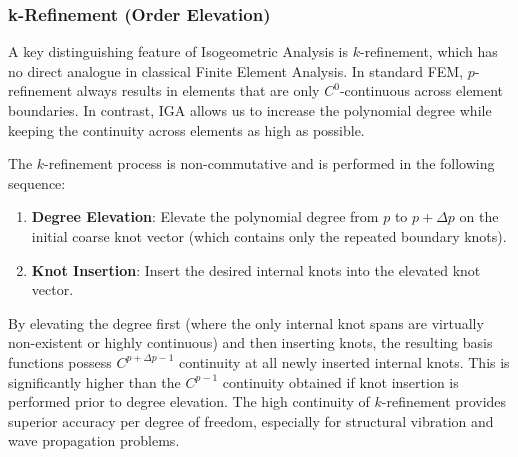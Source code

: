 \subsubsection{k-Refinement (Order Elevation)}
A key distinguishing feature of Isogeometric Analysis is $k$-refinement, which has no direct analogue in classical Finite Element Analysis. In standard FEM, $p$-refinement always results in elements that are only $C^0$-continuous across element boundaries. In contrast, IGA allows us to increase the polynomial degree while keeping the continuity across elements as high as possible.

The $k$-refinement process is non-commutative and is performed in the following sequence:
\begin{enumerate}
    \item \textbf{Degree Elevation}: Elevate the polynomial degree from $p$ to $p + \Delta p$ on the initial coarse knot vector (which contains only the repeated boundary knots).
    \item \textbf{Knot Insertion}: Insert the desired internal knots into the elevated knot vector.
\end{enumerate}
By elevating the degree first (where the only internal knot spans are virtually non-existent or highly continuous) and then inserting knots, the resulting basis functions possess $C^{p + \Delta p - 1}$ continuity at all newly inserted internal knots. This is significantly higher than the $C^{p-1}$ continuity obtained if knot insertion is performed prior to degree elevation. The high continuity of $k$-refinement provides superior accuracy per degree of freedom, especially for structural vibration and wave propagation problems.

